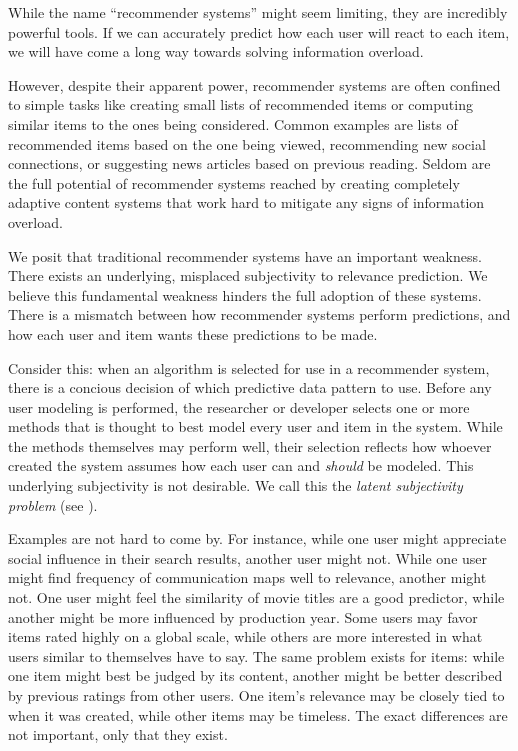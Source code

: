 While the name ``recommender systems'' might seem limiting, they are incredibly powerful tools.
If we can accurately predict how each user will react to each item,
we will have come a long way towards solving information overload.

However, despite their apparent power, recommender systems are often confined
to simple tasks like creating small lists of recommended items
or computing similar items to the ones being considered.
Common examples are lists of recommended items based on the one being viewed, 
recommending new social connections, or suggesting news articles based on previous reading.
Seldom are the full potential of recommender systems reached by creating completely adaptive
content systems that work hard to mitigate any signs of information overload.

We posit that traditional recommender systems have an important weakness.
There exists an underlying, misplaced subjectivity to relevance prediction.
We believe this fundamental weakness hinders the full adoption of these systems.
There is a mismatch between how recommender systems perform predictions,
and how each user and item wants these predictions to be made.

Consider this: 
when an algorithm is selected for use in a recommender system,
there is a concious decision of which predictive data pattern to use.
Before any user modeling is performed, the researcher or developer selects
one or more methods that is thought to best model every user and item in the system.
While the methods themselves may perform well, their selection
reflects how whoever created the system assumes how each user
can and \emph{should} be modeled. This underlying subjectivity is not desirable.
We call this the \emph{latent subjectivity problem}
(see \cite[p.33]{Bjorkoy2011}).

Examples are not hard to come by.
For instance, while one user might appreciate social
influence in their search results, another user might not.
While one user might find frequency of communication maps well to relevance,
another might not. 
One user might feel the similarity of movie titles are a good predictor,
while another might be more influenced by production year.
Some users may favor items rated highly on a global scale,
while others are more interested in what users similar to themselves have to say.
The same problem exists for items: while one item might best be judged by its content,
another might be better described by previous ratings from other users.
One item's relevance may be closely tied to when it was created,
while other items may be timeless.
The exact differences are not important, only that they exist.

